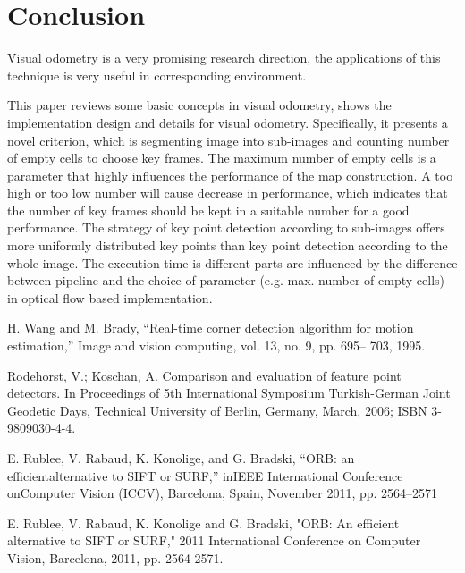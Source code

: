 \documentclass{easychair}
\begin{document}
\section{Conclusion}
Visual odometry is a very promising research direction, the applications of this technique is very useful in corresponding environment.

This paper reviews some basic concepts in visual odometry, shows the implementation design and details for visual odometry. Specifically, it presents a novel criterion, which is segmenting image into sub-images and counting number of empty cells to choose key frames. The maximum number of empty cells is a parameter that highly influences the performance of the map construction. A too high or too low number will cause decrease in performance, which indicates that the number of key frames should be kept in a suitable number for a good performance. The strategy of key point detection according to sub-images offers more uniformly distributed key points than key point detection according to the whole image. The execution time is different parts are influenced by the difference between pipeline and the choice of parameter (e.g. max. number of empty cells) in optical flow based implementation.




\begin{thebibliography}{00}
	
	 H. Wang and M. Brady, “Real-time corner detection algorithm for
	motion estimation,” Image and vision computing, vol. 13, no. 9, pp. 695–
	703, 1995.
	
	 Rodehorst, V.; Koschan, A. Comparison and evaluation of feature point detectors. In Proceedings
	of 5th International Symposium Turkish-German Joint Geodetic Days, Technical University of
	Berlin, Germany, March, 2006; ISBN 3-9809030-4-4.
	
	 E. Rublee, V. Rabaud, K. Konolige, and G. Bradski, “ORB: an efficientalternative  to  SIFT  or  SURF,”  inIEEE  International  Conference  onComputer Vision (ICCV), Barcelona, Spain, November 2011, pp. 2564–2571
	
	 E. Rublee, V. Rabaud, K. Konolige and G. Bradski, "ORB: An efficient alternative to SIFT or SURF," 2011 International Conference on Computer Vision, Barcelona, 2011, pp. 2564-2571.

	
	
	
\end{thebibliography}



%
%
%
%
%
\end{document}
